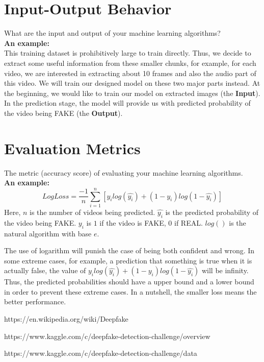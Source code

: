 \documentclass[runningheads]{llncs}
\begin{document}
\section{Input-Output Behavior}
What are the input and output of your machine learning algorithms?   \\
\textbf{An example:}\\
This training dataset is prohibitively large to train directly. Thus, we decide to extract some useful information from these smaller chunks, for example, for each video, we are interested in extracting about 10 frames and also the audio part of this video. We will train our designed model on these two major parts instead. At the beginning, we would like to train our model on extracted images (the \textbf{Input}). In the prediction stage, the model will provide us with predicted probability of the video being FAKE (the \textbf{Output}). 



\section{Evaluation Metrics}
The metric (accuracy score) of evaluating your machine learning algorithms.  \\
\textbf{An example:}\\
\begin{equation}
    LogLoss = \frac{-1}{n}\sum_{i=1}^{n}[y_ilog(\hat{y_i})+(1-y_i)log(1-\hat{y_i})]
\end{equation}
Here, $n$ is the number of videos being predicted. $\hat{y_i}$ is the predicted probability of the video being FAKE. $y_i$ is $1$ if the video is FAKE, $0$ if REAL. $log()$ is the natural algorithm with base $e$.


The use of logarithm will punish the case of being both confident and wrong. In some extreme cases, for example, a prediction that something is true when it is actually false, the value of $y_ilog(\hat{y_i})+(1-y_i)log(1-\hat{y_i})$ will be infinity. Thus, the predicted probabilities should have a upper bound and a lower bound in order to prevent these extreme cases. In a nutshell, the smaller loss means the better performance. 


\begin{thebibliography}{9}
https://en.wikipedia.org/wiki/Deepfake

https://www.kaggle.com/c/deepfake-detection-challenge/overview

https://www.kaggle.com/c/deepfake-detection-challenge/data

\end{thebibliography}
\end{document}
